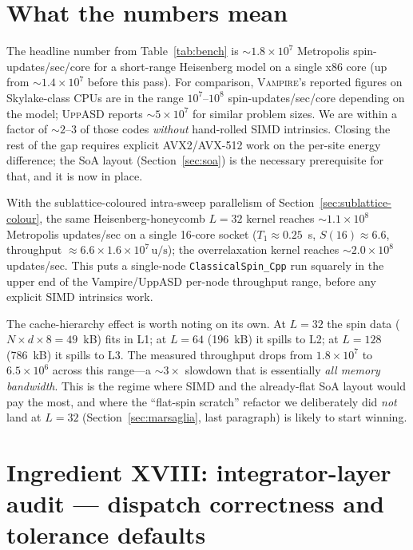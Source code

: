 \documentclass[11pt,letterpaper]{article}
\begin{document}
\section{What the numbers mean}

The headline number from Table~\ref{tab:bench} is
$\sim 1.8 \times 10^{7}$ Metropolis spin-updates/sec/core for a
short-range Heisenberg model on a single x86 core (up from
$\sim 1.4 \times 10^{7}$ before this pass).  For comparison,
\textsc{Vampire}'s reported figures on Skylake-class CPUs are in the
range $10^{7}$--$10^{8}$ spin-updates/sec/core depending on the model;
\textsc{UppASD} reports $\sim 5 \times 10^{7}$ for similar problem
sizes.  We are within a factor of $\sim 2$--$3$ of those codes
\emph{without} hand-rolled SIMD intrinsics.  Closing the rest of the
gap requires explicit AVX2/AVX-512 work on the per-site energy
difference; the SoA layout (Section~\ref{sec:soa}) is the necessary
prerequisite for that, and it is now in place.

With the sublattice-coloured intra-sweep parallelism of
Section~\ref{sec:sublattice-colour}, the same Heisenberg-honeycomb
$L = 32$ kernel reaches $\sim 1.1 \times 10^{8}$ Metropolis
updates/sec on a single 16-core socket
($T_1 \approx 0.25$~s, $S(16) \approx 6.6$, throughput $\approx
6.6 \times 1.6 \times 10^{7}\,\text{u/s}$); the overrelaxation kernel
reaches $\sim 2.0 \times 10^{8}$ updates/sec.  This puts a
single-node \texttt{ClassicalSpin\_Cpp} run squarely in the
upper end of the Vampire/UppASD per-node throughput range, before
any explicit SIMD intrinsics work.

The cache-hierarchy effect is worth noting on its own.  At $L = 32$ the
spin data ($N \times d \times 8 = 49$~kB) fits in L1; at $L = 64$
(196~kB) it spills to L2; at $L = 128$ (786~kB) it spills to L3.  The
measured throughput drops from $1.8 \times 10^{7}$ to $6.5 \times 10^{6}$
across this range---a $\sim 3 \times$ slowdown that is essentially
\emph{all memory bandwidth}.  This is the regime where SIMD and the
already-flat SoA layout would pay the most, and where the
``flat-spin scratch'' refactor we deliberately did \emph{not}
land at $L = 32$ (Section~\ref{sec:marsaglia}, last paragraph) is
likely to start winning.

\section{Ingredient XVIII: integrator-layer audit --- dispatch
correctness and tolerance defaults}
\label{sec:ing-xviii}
\end{document}
